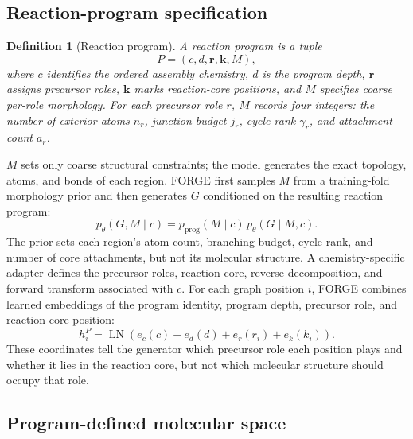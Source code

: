 \documentclass{article}
\newtheorem{definition}[theorem]{Definition}
\begin{document}
\subsection{Reaction-program specification}

\begin{definition}[Reaction program]
A reaction program is a tuple
\begin{equation}
    P=(c,d,\mathbf{r},\mathbf{k},M),
\end{equation}
where $c$ identifies the ordered assembly chemistry, $d$ is the program depth, $\mathbf{r}$ assigns
precursor roles, $\mathbf{k}$ marks reaction-core positions, and $M$ specifies coarse per-role
morphology.
For each precursor role $r$, $M$ records four integers: the number of exterior atoms $n_r$,
junction budget $j_r$, cycle rank $\gamma_r$, and attachment count $a_r$.
\end{definition}
$M$ sets only coarse structural constraints; the model generates the exact topology, atoms, and
bonds of each region.
FORGE first samples $M$ from a training-fold morphology prior and then generates $G$ conditioned on
the resulting reaction program:
\begin{equation}
    p_\theta(G,M\mid c)
    = p_{\mathrm{prog}}(M\mid c)\,
    p_\theta(G\mid M,c).
\end{equation}
The prior sets each region's atom count, branching budget, cycle rank, and number of core
attachments, but not its molecular structure.
A chemistry-specific adapter defines the precursor roles, reaction core, reverse decomposition, and
forward transform associated with $c$.
For each graph position $i$, FORGE combines learned embeddings of the program identity, program
depth, precursor role, and reaction-core position:
\begin{equation}
    h_i^P
    = \operatorname{LN}\!\left(
        e_c(c) + e_d(d) + e_r(r_i) + e_k(k_i)
    \right).
\end{equation}
These coordinates tell the generator which precursor role each position plays and whether it lies in
the reaction core, but not which molecular structure should occupy that role.

\subsection{Program-defined molecular space}
\end{document}
